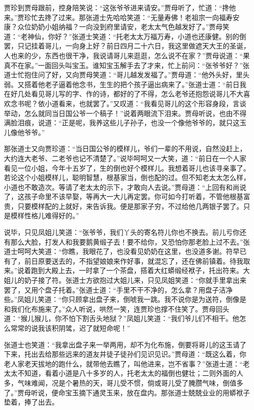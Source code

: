 贾珍到贾母跟前，控身陪笑说：``这张爷爷进来请安。''贾母听了，忙道：``搀他来。''贾珍忙去搀了过来。那张道士先哈哈笑道：``无量寿佛！老祖宗一向福寿安康？众位奶奶小姐纳福？一向没到府里请安，老太太气色越发好了。''贾母笑道：``老神仙，你好？''张道士笑道：``托老太太万福万寿，小道也还康健。别的倒罢，只记挂着哥儿，一向身上好？前日四月二十六日，我这里做遮天大王的圣诞，人也来的少，东西也很干净，我说请哥儿来逛逛，怎么说不在家？''贾母说道：``果真不在家。''一面回头叫宝玉。谁知宝玉解手去了才来，忙上前问：``张爷爷好？''张道士忙抱住问了好，又向贾母笑道：``哥儿越发发福了。''贾母道：``他外头好，里头弱。又搭着他老子逼着他念书，生生的把个孩子逼出病来了。''张道士道：``前日我在好几处看见哥儿写的字、作的诗，都好的了不得，怎么老爷还抱怨说哥儿不大喜欢念书呢？依小道看来，也就罢了。''又叹道：``我看见哥儿的这个形容身段，言谈举动，怎么就同当日国公爷一个稿子！''说着两眼流下泪来。贾母听说，也由不得满脸泪痕，说道：``正是呢，我养这些儿子孙子，也没一个像他爷爷的，就只这玉儿像他爷爷。''

那张道士又向贾珍道：``当日国公爷的模样儿，爷们一辈的不用说，自然没赶上，大约连大老爷、二老爷也记不清楚了。''说毕呵呵又一大笑，道：``前日在一个人家看见一位小姐，今年十五岁了，生的倒也好个模样儿。我想着哥儿也该寻亲事了。若论这个小姐模样儿，聪明智慧，根基家当，倒也配的过。但不知老太太怎么样，小道也不敢造次。等请了老太太的示下，才敢向人去说。''贾母道：``上回有和尚说了，这孩子命里不该早娶，等再大一大儿再定罢。你可如今打听着，不管他根基富贵，只要模样配的上就好，来告诉我。便是那家子穷，不过给他几两银子罢了。只是模样性格儿难得好的。''

说毕，只见凤姐儿笑道：``张爷爷，我们丫头的寄名符儿你也不换去。前儿亏你还有那么大脸，打发人和我要鹅黄缎子去！要不给你，又恐怕你那老脸上过不去。''张道士呵呵大笑道：``你瞧，我眼花了，也没看见奶奶在这里，也没道多谢。符早已有了，前日原要送去的，不指望娘娘来作好事，就混忘了，还在佛前镇着。待我取来。''说着跑到大殿上去，一时拿了一个茶盘，搭着大红蟒缎经袱子，托出符来。大姐儿的奶子接了符。张道士方欲抱过大姐儿来，只见凤姐笑道：``你就手里拿出来罢了，又用个盘子托着。''张道士道：``手里不干不净的，怎么拿？用盘子洁净些。''凤姐儿笑道：``你只顾拿出盘子来，倒唬我一跳。我不说你是为送符，倒像是和我们化布施来了。''众人听说，哄然一笑，连贾珍也撑不住笑了。贾母回头道：``猴儿猴儿，你不怕下割舌头地狱？''凤姐儿笑道：``我们爷儿们不相干。他怎么常常的说我该积阴骘，迟了就短命呢！''

张道士也笑道：``我拿出盘子来一举两用，却不为化布施，倒要将哥儿的这玉请了下来，托出去给那些远来的道友并徒子徒孙们见识见识。''贾母道：``既这么着，你老人家老天拔地的跑什么，就带他去瞧了，叫他进来，岂不省事？''张道士道：``老太太不知道，看着小道是八十多岁的人，托老太太的福倒也健壮；二则外面的人多，气味难闻，况是个暑热的天，哥儿受不惯，倘或哥儿受了腌臜气味，倒值多了。''贾母听说，便命宝玉摘下通灵玉来，放在盘内。那张道士兢兢业业的用蟒袱子垫着，捧了出去。

